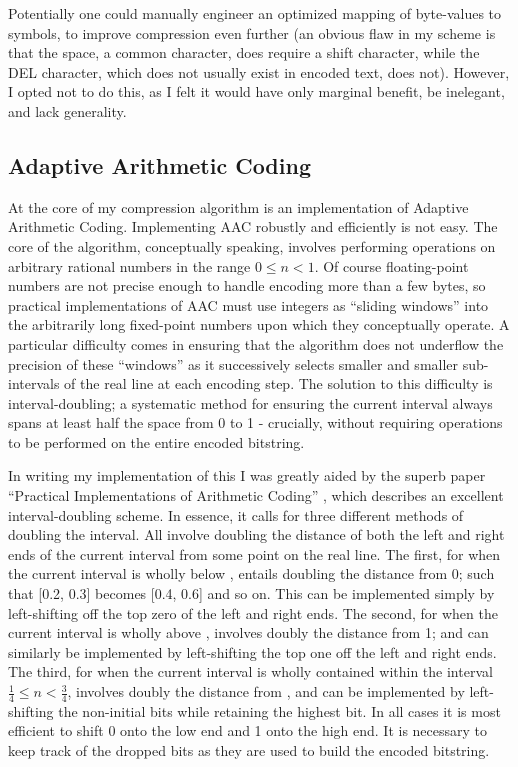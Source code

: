 \documentclass[11pt]{article}
\begin{document}
Potentially one could manually engineer an optimized mapping of byte-values to symbols, to improve compression even further (an obvious flaw in my scheme is that the space, a common character, does require a shift character, while the DEL character, which does not usually exist in encoded text, does not). However, I opted not to do this, as I felt it would have only marginal benefit, be inelegant, and lack generality.


\subsection{Adaptive Arithmetic Coding}

At the core of my compression algorithm is an implementation of Adaptive Arithmetic Coding. Implementing AAC robustly and efficiently is not easy. The core of the algorithm, conceptually speaking, involves performing operations on arbitrary rational numbers in the range $0 \leq n < 1$. Of course floating-point numbers are not precise enough to handle encoding more than a few bytes, so practical implementations of AAC must use integers as \enquote{sliding windows} into the arbitrarily long fixed-point numbers upon which they conceptually operate. A particular difficulty comes in ensuring that the algorithm does not underflow the precision of these \enquote{windows} as it successively selects smaller and smaller sub-intervals of the real line at each encoding step. The solution to this difficulty is interval-doubling; a systematic method for ensuring the current interval always spans at least half the space from 0 to 1 - crucially, without requiring operations to be performed on the entire encoded bitstring.

In writing my implementation of this I was greatly aided by the superb paper \enquote{Practical Implementations of Arithmetic Coding} \cite{howard1992practical}, which describes an excellent interval-doubling scheme. In essence, it calls for three different methods of doubling the interval. All involve doubling the distance of both the left and right ends of the current interval from some point on the real line. The first, for when the current interval is wholly below , entails doubling the distance from 0; such that [0.2, 0.3] becomes [0.4, 0.6] and so on. This can be implemented simply by left-shifting off the top zero of the left and right ends. The second, for when the current interval is wholly above , involves doubly the distance from 1; and can similarly be implemented by left-shifting the top one off the left and right ends. The third, for when the current interval is wholly contained within the interval $\frac{1}{4} \leq n < \frac{3}{4}$, involves doubly the distance from , and can be implemented by left-shifting the non-initial bits while retaining the highest bit. In all cases it is most efficient to shift 0 onto the low end and 1 onto the high end. It is necessary to keep track of the dropped bits as they are used to build the encoded bitstring.
\end{document}

